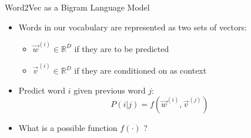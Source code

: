 






\begin{vbframe}{Word2Vec as a Bigram Language Model}

\vfill

\begin{itemize}
	\item Words in our vocabulary are represented as two sets of vectors:
		\begin{itemize}
			 \item $\vec w^{(i)} \in \mathbb{R}^D$ if they are to be predicted
			 \item $\vec v^{(i)} \in \mathbb{R}^D$ if they are conditioned on as context
		\end{itemize}
	\item Predict word $i$ given previous word $j$: $$P(i|j) = f(\vec w^{(i)}, \vec v^{(j)})$$
	\item \ques What is a possible function $f(\cdot)$ ?
\end{itemize}

\vfill

\end{vbframe}

